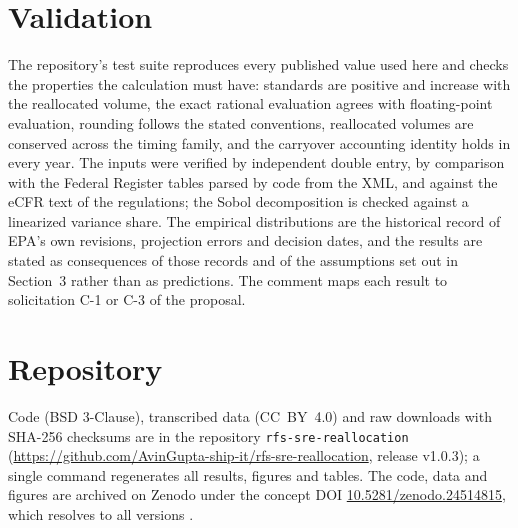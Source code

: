 \documentclass[11pt]{article}
\newcommand{\releaseversion}{1.0.3}
\begin{document}
\section{Validation}
The repository's test suite reproduces every published value used here and checks the properties the calculation must have: standards are positive and increase with the reallocated volume, the exact rational evaluation agrees with floating-point evaluation, rounding follows the stated conventions, reallocated volumes are conserved across the timing family, and the carryover accounting identity holds in every year. The inputs were verified by independent double entry, by comparison with the Federal Register tables parsed by code from the XML, and against the eCFR text of the regulations; the Sobol decomposition is checked against a linearized variance share. The empirical distributions are the historical record of EPA's own revisions, projection errors and decision dates, and the results are stated as consequences of those records and of the assumptions set out in Section~3 rather than as predictions. The comment maps each result to solicitation C-1 or C-3 of the proposal.

\section{Repository}
Code (BSD 3-Clause), transcribed data (CC~BY~4.0) and raw downloads with SHA-256 checksums are in the repository \texttt{rfs-sre-reallocation} (\url{https://github.com/AvinGupta-ship-it/rfs-sre-reallocation}, release v\releaseversion); a single command regenerates all results, figures and tables. The code, data and figures are archived on Zenodo under the concept DOI \href{https://doi.org/10.5281/zenodo.24514815}{10.5281/zenodo.24514815}, which resolves to all versions \citep{gupta2026repository}.

\FloatBarrier


\end{document}
